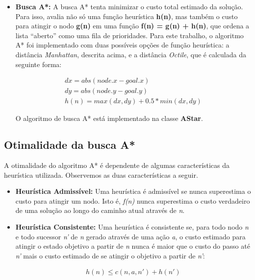 \documentclass[12pt]{article}
\begin{document}
\begin{itemize}
	\item \textbf{Busca A*:} A busca A* tenta minimizar o custo total estimado da solução. Para isso, avalia não só uma função heurística \textbf{h(n)}, mas também o custo para atingir o nodo \textbf{g(n)} em uma função \textbf{f(n) = g(n) + h(n)}, que ordena a lista ``aberto'' como uma fila de prioridades. Para este trabalho, o algoritmo A* foi implementado com duas possíveis opções de função heurística: a distância \textit{Manhattan}, descrita acima, e a distância \textit{Octile}, que é calculada da seguinte forma:

	\begin{align*}
		dx = abs(node.x - goal.x) \\
		dy = abs(node.y - goal.y) \\
		h(n) = max(dx, dy) + 0.5 * min(dx, dy)
	\end{align*}

	O algoritmo de busca A* está implementado na classe \textbf{AStar}.

\end{itemize}

\subsection{Otimalidade da busca A*} \label{sec:otima}

A otimalidade do algoritmo A* é dependente de algumas características da heurística utilizada. Observemos as duas características a seguir.

\begin{itemize}
	\item \textbf{Heurística Admissível:} Uma heurística é admissível se nunca superestima o custo para atingir um nodo. Isto é, \textit{f(n)} nunca superestima o custo verdadeiro de uma solução ao longo do caminho atual através de \textit{n}.

	\item \textbf{Heurística Consistente:} Uma heurística é consistente se, para todo nodo \textit{n} e todo sucessor \textit{n'} de \textit{n} gerado através de uma ação \textit{a}, o custo estimado para atingir o estado objetivo a partir de \textit{n} nunca é maior que o custo do passo até \textit{n'} mais o custo estimado de se atingir o objetivo a partir de \textit{n'}:

	\begin{align*}
		h(n) \leq c(n, a, n') + h(n')
	\end{align*}

\end{itemize}
\end{document}
